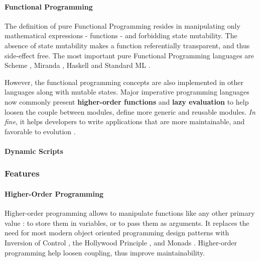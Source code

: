 \paragraph{Functional Programming} \label{chapter3:software-maintainability:programming-models:functional-programming}


The definition of pure Functional Programming resides in manipulating only mathematical expressions - functions - and forbidding state mutability.
The absence of state mutability makes a function referentially transparent, and thus side-effect free.
The most important pure Functional Programming languages are Scheme \cite{Rees1986}, Miranda \cite{Turner1986}, Haskell \cite{Hudak1992} and Standard ML \cite{Milner1997}.

However, the functional programming concepts are also implemented in other languages along with mutable states.
Major imperative programming languages now commonly present \textbf{higher-order functions} and \textbf{lazy evaluation} to help loosen the couple between modules, define more generic and reusable modules.
\textit{In fine}, it helps developers to write applications that are more maintainable, and favorable to evolution \cite{Hughes1989,Turner1981}.

\paragraph{Dynamic Scripts}


\subsubsection{Features}

\paragraph{Higher-Order Programming}

Higher-order programming allows to manipulate functions like any other primary value : to store them in variables, or to pass them as arguments.
It replaces the need for most modern object oriented programming design patterns  with Inversion of Control \cite{Johnson}, the Hollywood Principle \cite{Sweet1985}, and Monads \cite{Wadler1992}.
Higher-order programming help loosen coupling, thus improve maintainability.

